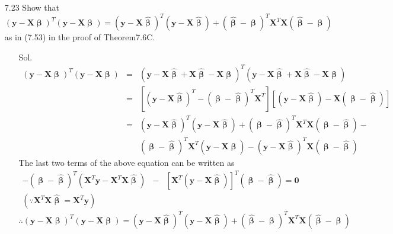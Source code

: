 \documentclass[12pt]{article} %
\begin{document}
\begin{enumerate}
  \item[7.23] Show that $(\mathbf{y}-\mathbf{X}\pmb{\upbeta})^{T}(\mathbf{y}-\mathbf{X}\pmb{\upbeta})=
  (\mathbf{y}-\mathbf{X}\pmb{\hat{\upbeta}})^{T}(\mathbf{y}-\mathbf{X}\pmb{\hat{\upbeta}})+
  (\pmb{\hat{\upbeta}}-\pmb{\upbeta})^{T}\mathbf{X}^{T}\mathbf{X}(\pmb{\hat{\upbeta}}-\pmb{\upbeta})$
  as in (7.53) in the proof of Theorem7.6C.
  \begin{enumerate}
	\item[Sol.]
	\begin{eqnarray*}
	   (\mathbf{y}-\mathbf{X}\pmb{\upbeta})^{T}(\mathbf{y}-\mathbf{X}\pmb{\upbeta})&=&
           (\mathbf{y}-\mathbf{X}\pmb{\hat{\upbeta}}+\mathbf{X}\pmb{\hat{\upbeta}}-\mathbf{X}\pmb{\upbeta})^{T}
           (\mathbf{y}-\mathbf{X}\pmb{\hat{\upbeta}}+\mathbf{X}\pmb{\hat{\upbeta}}-\mathbf{X}\pmb{\upbeta})\\
           &=&
           [(\mathbf{y}-\mathbf{X}\pmb{\hat{\upbeta}})^{T}-(\pmb{\upbeta}-\pmb{\hat{\upbeta}})^{T}\mathbf{X}^{T}]
           [(\mathbf{y}-\mathbf{X}\pmb{\hat{\upbeta}})-\mathbf{X}(\pmb{\upbeta}-\pmb{\hat{\upbeta}})]\\
           &=&
	  (\mathbf{y}-\mathbf{X}\pmb{\hat{\upbeta}})^{T}(\mathbf{y}-\mathbf{X}\pmb{\hat{\upbeta}})+
          (\pmb{\upbeta}-\pmb{\hat{\upbeta}})^{T}\mathbf{X}^{T}\mathbf{X}(\pmb{\upbeta}-\pmb{\hat{\upbeta}})-\\
           &~&
          (\pmb{\upbeta}-\pmb{\hat{\upbeta}})^{T}\mathbf{X}^{T}(\mathbf{y}-\mathbf{X}\pmb{\hat{\upbeta}})-
          (\mathbf{y}-\mathbf{X}\pmb{\hat{\upbeta}})^{T}\mathbf{X}(\pmb{\upbeta}-\pmb{\hat{\upbeta}})
	 \end{eqnarray*}
	 The last two terms of the above equation can be written as	 
	 \begin{eqnarray*}
            -(\pmb{\upbeta}-\pmb{\hat{\upbeta}})^{T}(\mathbf{X}^{T}\mathbf{y}-\mathbf{X}^{T}\mathbf{X}\pmb{\hat{\upbeta}})
	    &-&[\mathbf{X}^{T}(\mathbf{y}-\mathbf{X}\pmb{\hat{\upbeta}})]^{T}(\pmb{\upbeta}-\pmb{\hat{\upbeta}})
            =\mathbf{0}\\
            (\because \mathbf{X}^{T}\mathbf{X}\pmb{\hat{\upbeta}}= \mathbf{X}^{T}\mathbf{y})
         \end{eqnarray*}
	$$
	\therefore (\mathbf{y}-\mathbf{X}\pmb{\upbeta})^{T}(\mathbf{y}-\mathbf{X}\pmb{\upbeta})=
  (\mathbf{y}-\mathbf{X}\pmb{\hat{\upbeta}})^{T}(\mathbf{y}-\mathbf{X}\pmb{\hat{\upbeta}})+
  (\pmb{\hat{\upbeta}}-\pmb{\upbeta})^{T}\mathbf{X}^{T}\mathbf{X}(\pmb{\hat{\upbeta}}-\pmb{\upbeta})
$$
\end{enumerate}
\end{enumerate}
\end{document}
